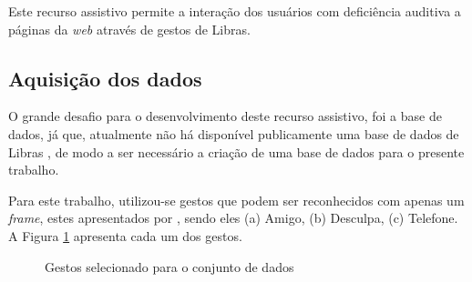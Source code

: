 \par Este recurso assistivo permite a interação dos usuários com deficiência auditiva a páginas da \textit{web} através de gestos de Libras. 

\subsection{Aquisição dos dados}

\par O grande desafio para o desenvolvimento deste recurso assistivo, foi a base de dados, já que, atualmente não há disponível publicamente uma base de dados de Libras \cite{Magalh2018}, de modo a ser necessário a criação de uma base de dados para o presente trabalho.

\par Para este trabalho, utilizou-se gestos que podem ser reconhecidos com apenas um \textit{frame}, estes apresentados por , sendo eles (a) Amigo, (b) Desculpa, (c) Telefone. A Figura \ref{figure:gestos_selecionados} apresenta cada um dos gestos.

\begin{figure}[H]
    \centering
    \qquad
    \qquad
    \qquad
    \caption{Gestos selecionado para o conjunto de dados}%
    \label{figure:gestos_selecionados}%
\end{figure}

